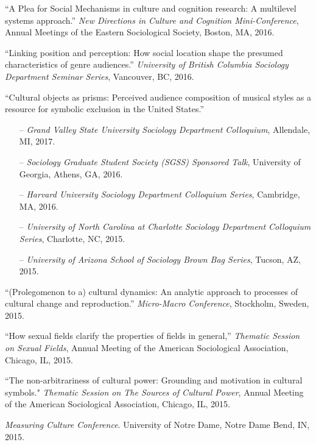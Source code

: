 \ind ``A Plea for Social Mechanisms in culture and cognition research: A multilevel systems approach.''  {\em New Directions in Culture and Cognition Mini-Conference}, Annual Meetings of the Eastern Sociological Society, Boston, MA, 2016.

\ind ``Linking position and perception: How social location shape the presumed characteristics of genre audiences.'' {\em University of British Columbia Sociology Department Seminar Series}, Vancouver, BC, 2016.

\ind ``Cultural objects as prisms: Perceived audience composition of musical styles as a resource for symbolic exclusion in the United States.'' 
\begin{itemize}[leftmargin=0.8in, topsep = 0pt]
	\setlength\itemsep{-0.55em}
	\item[--] {\em Grand Valley State University Sociology Department Colloquium}, Allendale, MI, 2017.
	\item[--] {\em Sociology Graduate Student Society (SGSS) Sponsored Talk}, University of Georgia, Athens, GA, 2016.
	\item[--] {\em Harvard University Sociology Department Colloquium Series}, Cambridge, MA, 2016.
	\item[--] {\em University of North Carolina at Charlotte Sociology Department Colloquium Series}, Charlotte, NC, 2015. 
	\item[--] {\em University of Arizona School of Sociology Brown Bag Series},  Tucson, AZ, 2015. 
\end{itemize} 

\ind ``(Prolegomenon to a) cultural dynamics: An analytic approach to processes of cultural change and reproduction.'' \emph{Micro-Macro Conference}, Stockholm, Sweden, 2015. 

\ind ``How sexual fields clarify the properties of fields in general,'' \emph{Thematic Session on Sexual Fields}, Annual Meeting of the American Sociological Association, Chicago, IL, 2015.

\ind ``The non-arbitrariness of cultural power: Grounding and motivation in cultural symbols." \emph{Thematic Session on The Sources of Cultural Power}, Annual Meeting of the American Sociological Association, Chicago, IL, 2015.

\emph{Measuring Culture Conference}. University of Notre Dame, Notre Dame Bend, IN, 2015. 
